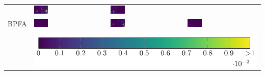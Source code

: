 \begin{tabular}{m{}*{3}{M{0.21\textwidth}}}
&\includegraphics[width=0.2\textwidth]{img/chapitre4/figure15/synth_hole/SynthH_wKSVD_matlab_band_1.png}
&\includegraphics[width=0.2\textwidth]{img/chapitre4/figure15/synth_hole/SynthH_wKSVD_matlab_band_2.png}
\\
BPFA
&\includegraphics[width=0.2\textwidth]{img/chapitre4/figure15/synth_hole/SynthH_BPFA_matlab_band_0.png}
&\includegraphics[width=0.2\textwidth]{img/chapitre4/figure15/synth_hole/SynthH_BPFA_matlab_band_1.png}
&\includegraphics[width=0.2\textwidth]{img/chapitre4/figure15/synth_hole/SynthH_BPFA_matlab_band_2.png}
\\
%
&\\
\end{tabular}